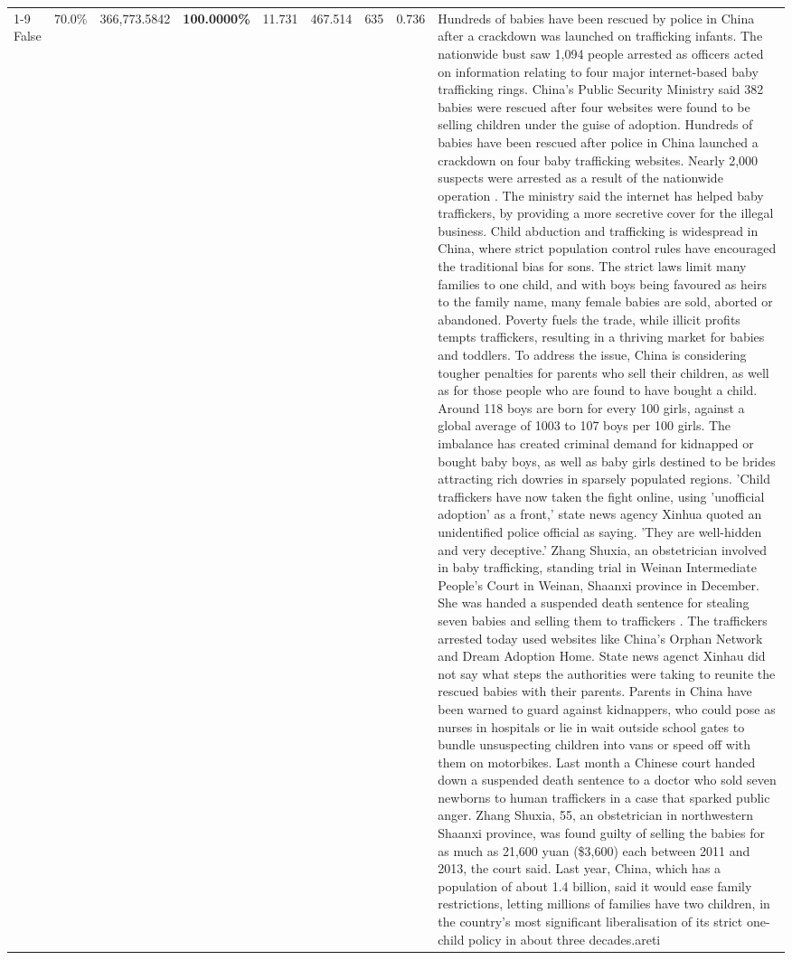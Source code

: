 \begin{table}[H]
\begin{tabular}{lllrlllll}
\cline{1-9}
False & 70.0\% & 366,773.5842 & \bfseries \color{red} 100.0000\% & 11.731 & 467.514 & 635 & 0.736 & Hundreds of babies have been rescued by police in China after a crackdown was launched on trafficking infants. The nationwide bust saw 1,094 people arrested as officers acted on information relating to four major internet-based baby trafficking rings. China's Public Security Ministry said 382 babies were rescued after four websites were found to be selling children under the guise of adoption. Hundreds of babies have been rescued after police in China launched a crackdown on four baby trafficking websites. Nearly 2,000 suspects were arrested as a result of the nationwide operation . The ministry said the internet has helped baby traffickers, by providing a more secretive cover for the illegal business. Child abduction and trafficking is widespread in China, where strict population control rules have encouraged the traditional bias for sons. The strict laws limit many families to one child, and with boys being favoured as heirs to the family name, many female babies are sold, aborted or abandoned. Poverty fuels the trade, while illicit profits tempts traffickers, resulting in a thriving market for babies and toddlers. To address the issue, China is considering tougher penalties for parents who sell their children, as well as for those people who are found to have bought a child. Around 118 boys are born for every 100 girls, against a global average of 1003 to 107 boys per 100 girls. The imbalance has created criminal demand for kidnapped or bought baby boys, as well as baby girls destined to be brides attracting rich dowries in sparsely populated regions. 'Child traffickers have now taken the fight online, using 'unofficial adoption' as a front,' state news agency Xinhua quoted an unidentified police official as saying. 'They are well-hidden and very deceptive.' Zhang Shuxia, an obstetrician involved in baby trafficking, standing trial in Weinan Intermediate People's Court in Weinan, Shaanxi province in December. She was handed a suspended death sentence for stealing seven babies and selling them to traffickers . The traffickers arrested today used websites like China's Orphan Network and Dream Adoption Home. State news agenct Xinhau did not say what steps the authorities were taking to reunite the rescued babies with their parents. Parents in China have been warned to guard against kidnappers, who could pose as nurses in hospitals or lie in wait outside school gates to bundle unsuspecting children into vans or speed off with them on motorbikes. Last month a Chinese court handed down a suspended death sentence to a doctor who sold seven newborns to human traffickers in a case that sparked public anger. Zhang Shuxia, 55, an obstetrician in northwestern Shaanxi province, was found guilty of selling the babies for as much as 21,600 yuan (\$3,600) each between 2011 and 2013, the court said. Last year, China, which has a population of about 1.4 billion, said it would ease family restrictions, letting millions of families have two children, in the country's most significant liberalisation of its strict one-child policy in about three decades.areti \\

\end{tabular}
\end{table}

